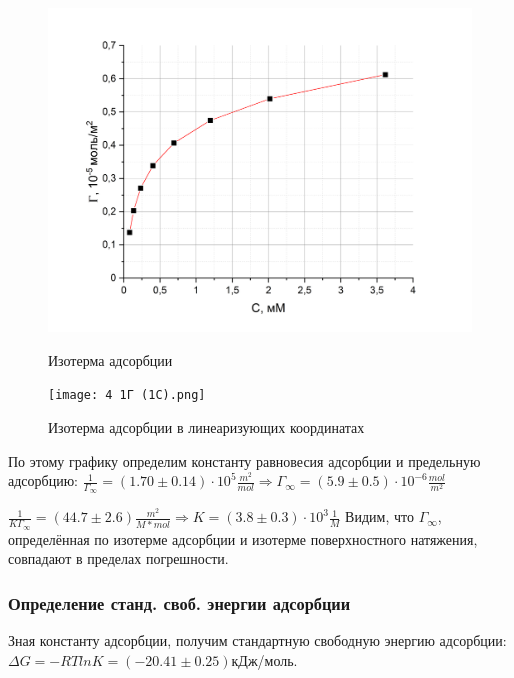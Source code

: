 \documentclass[a4paper, 12pt]{article}
\begin{document}
\begin{figure}[h!]
\begin{center}
\begin{minipage}[h]{0.5\linewidth}
\includegraphics[width=1\textwidth]{ads.png}
\caption{Изотерма адсорбции} %
\label{ris:experimoriginal} %
\end{minipage}
\hfill 
\begin{minipage}[h]{0.45\linewidth}
\texttt{[image: 4 1Г (1С).png]}
\caption{Изотерма адсорбции в линеаризующих координатах}
\label{ris:experimcoded}
\end{minipage}
\end{center}
\end{figure}

По этому графику определим константу равновесия адсорбции и предельную адсорбцию: $\frac{1}{\Gamma_{\infty}} = (1.70 \pm 0.14)\cdot 10^5 \frac{m^2}{mol} \Rightarrow \Gamma_{\infty} = (5.9 \pm 0.5)\cdot 10^{-6} \frac{mol}{m^2}$ 

$\frac{1}{K \Gamma_{\infty}} = (44.7 \pm 2.6) \frac{m^2}{M*mol} \Rightarrow K = (3.8 \pm 0.3)\cdot 10^3 \frac{1}{M}$
Видим, что $\Gamma_{\infty}$, определённая по изотерме адсорбции и изотерме поверхностного натяжения, совпадают в пределах погрешности.

\subsubsection{Определение станд. своб. энергии адсорбции}
Зная константу адсорбции, получим стандартную свободную энергию адсорбции: $\Delta G = -RTlnK = (-20.41 \pm 0.25)$кДж/моль. 
\end{document}
